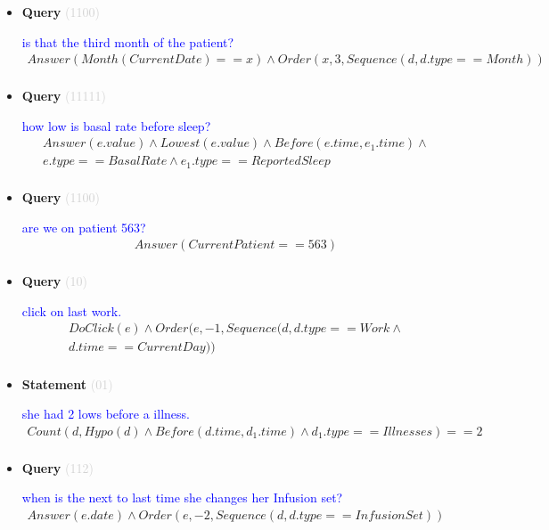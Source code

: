 \documentclass[11pt]{article}
\newcommand{\key}[1]{\textcolor{lightgray}{#1}}
\newcounter{CQuery}
\newcounter{CStatement}
\begin{document}
\begin{itemize}
\item
\textbf{Query\theCQuery} \key{(1100)} \addtocounter{CQuery}{1}
\textcolor{blue}{ is that the third month of the patient? }
\begin{multline*}
Answer(Month(CurrentDate)==x) \wedge Order(x, 3, Sequence(d, d.type==Month)) \\ 
\end{multline*}


\item
\textbf{Query\theCQuery} \key{(11111)} \addtocounter{CQuery}{1}
\textcolor{blue}{ how low is basal rate before sleep? }
\begin{multline*}
Answer(e.value) \wedge Lowest(e.value) \wedge Before(e.time, e_1.time) \wedge \\ 
e.type==BasalRate \wedge e_1.type==ReportedSleep \\ 
\end{multline*}


\item
\textbf{Query\theCQuery} \key{(1100)} \addtocounter{CQuery}{1}
\textcolor{blue}{ are we on patient 563? }
\begin{multline*}
Answer(CurrentPatient==563) \\ 
\end{multline*}


\item
\textbf{Query\theCQuery} \key{(10)} \addtocounter{CQuery}{1}
\textcolor{blue}{ click on last work. }
\begin{multline*}
DoClick(e) \wedge  Order(e, -1, Sequence(d, d.type==Work \wedge \\ 
d.time==CurrentDay)) \\ 
\end{multline*}


\item
\textbf{Statement\theCStatement} \key{(01)} \addtocounter{CStatement}{1}
\textcolor{blue}{ she had 2 lows before a illness. }
\begin{multline*}
Count(d, Hypo(d) \wedge Before(d.time, d_1.time) \wedge d_1.type==Illnesses)==2 \\ 
\end{multline*}


\item
\textbf{Query\theCQuery} \key{(112)} \addtocounter{CQuery}{1}
\textcolor{blue}{ when is the next to last time she changes her Infusion set? }
\begin{multline*}
Answer(e.date) \wedge Order(e, -2, Sequence(d, d.type==InfusionSet)) \\ 
\end{multline*}



\end{itemize}
\end{document}
